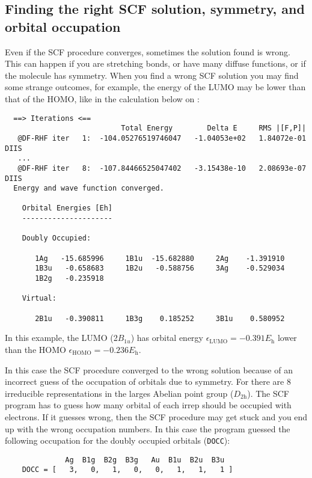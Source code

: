 \documentclass[../Main/chem532-notes.tex]{subfiles}
\begin{document}
\subsection{Finding the right SCF solution, symmetry, and orbital occupation}
Even if the SCF procedure converges, sometimes the solution found is wrong. This can happen if you are stretching bonds, or have many diffuse functions, or if the  molecule has symmetry.
When you find a wrong SCF solution you may find some strange outcomes, for example, the energy of the LUMO may be lower than that of the HOMO, like in the calculation below on :
\begin{verbatim}
  ==> Iterations <==
                           Total Energy        Delta E     RMS |[F,P]|
   @DF-RHF iter   1:  -104.05276519746047   -1.04053e+02   1.84072e-01 DIIS
   ...
   @DF-RHF iter   8:  -107.84466525047402   -3.15438e-10   2.08693e-07 DIIS
  Energy and wave function converged.

    Orbital Energies [Eh]
    ---------------------

    Doubly Occupied:

       1Ag   -15.685996     1B1u  -15.682880     2Ag    -1.391910
       1B3u   -0.658683     1B2u   -0.588756     3Ag    -0.529034
       1B2g   -0.235918

    Virtual:

       2B1u   -0.390811     1B3g    0.185252     3B1u    0.580952
\end{verbatim}
In this example, the LUMO (2$B_{1u}$) has orbital energy  $\epsilon_{\mathrm{LUMO}} = -0.391 E_\mathrm{h}$ lower than the HOMO $\epsilon_{\mathrm{HOMO}} = -0.236 E_\mathrm{h}$.

In this case the SCF procedure converged to the wrong solution because of an incorrect guess of the occupation of orbitals due to symmetry.
For  there are 8 irreducible representations in the larges Abelian point group ($D_{2\mathrm{h}}$). The SCF program has to guess how many orbital of each irrep should be occupied with electrons. If it guesses wrong, then the SCF procedure may get stuck and you end up with the wrong occupation numbers.
In this case the program guessed the following occupation for the doubly occupied orbitals (\verb|DOCC|):
\begin{verbatim}
              Ag  B1g  B2g  B3g   Au  B1u  B2u  B3u
    DOCC = [   3,   0,   1,   0,   0,   1,   1,   1 ]
\end{verbatim}
\end{document}
